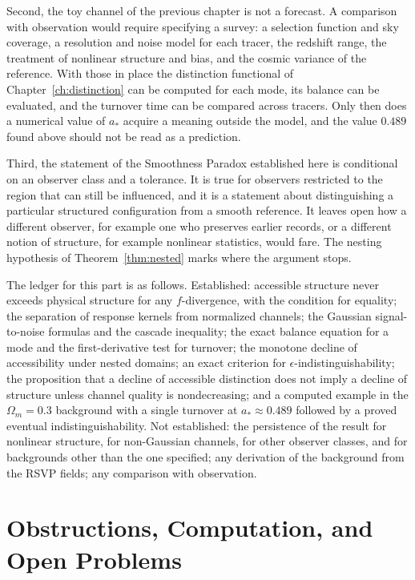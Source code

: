 \documentclass[11pt,oneside]{book}
\theoremstyle{definition}
\theoremstyle{remark}
\begin{document}
Second, the toy channel of the previous chapter is not a forecast. A comparison with observation would require specifying a survey: a selection function and sky coverage, a resolution and noise model for each tracer, the redshift range, the treatment of nonlinear structure and bias, and the cosmic variance of the reference. With those in place the distinction functional of Chapter~\ref{ch:distinction} can be computed for each mode, its balance can be evaluated, and the turnover time can be compared across tracers. Only then does a numerical value of $a_*$ acquire a meaning outside the model, and the value $0.489$ found above should not be read as a prediction.

Third, the statement of the Smoothness Paradox established here is conditional on an observer class and a tolerance. It is true for observers restricted to the region that can still be influenced, and it is a statement about distinguishing a particular structured configuration from a smooth reference. It leaves open how a different observer, for example one who preserves earlier records, or a different notion of structure, for example nonlinear statistics, would fare. The nesting hypothesis of Theorem~\ref{thm:nested} marks where the argument stops.

The ledger for this part is as follows. Established: accessible structure never exceeds physical structure for any $f$-divergence, with the condition for equality; the separation of response kernels from normalized channels; the Gaussian signal-to-noise formulas and the cascade inequality; the exact balance equation for a mode and the first-derivative test for turnover; the monotone decline of accessibility under nested domains; an exact criterion for $\epsilon$-indistinguishability; the proposition that a decline of accessible distinction does not imply a decline of structure unless channel quality is nondecreasing; and a computed example in the $\Omega_m=0.3$ background with a single turnover at $a_*\approx0.489$ followed by a proved eventual indistinguishability. Not established: the persistence of the result for nonlinear structure, for non-Gaussian channels, for other observer classes, and for backgrounds other than the one specified; any derivation of the background from the RSVP fields; any comparison with observation.

\part{Obstructions, Computation, and Open Problems}
\end{document}
